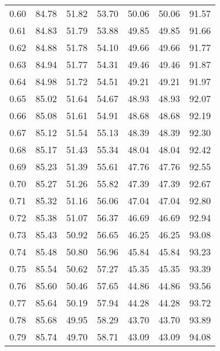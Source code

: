 \begin{tabular}{|c|c|c|c|c|c|c|}
      0.60 &     84.78 &     51.82 &      53.70 &   50.06 &      50.06 &         91.57 \\
      0.61 &     84.83 &     51.79 &      53.88 &   49.85 &      49.85 &         91.66 \\
      0.62 &     84.88 &     51.78 &      54.10 &   49.66 &      49.66 &         91.77 \\
      0.63 &     84.94 &     51.77 &      54.31 &   49.46 &      49.46 &         91.87 \\
      0.64 &     84.98 &     51.72 &      54.51 &   49.21 &      49.21 &         91.97 \\
      0.65 &     85.02 &     51.64 &      54.67 &   48.93 &      48.93 &         92.07 \\
      0.66 &     85.08 &     51.61 &      54.91 &   48.68 &      48.68 &         92.19 \\
      0.67 &     85.12 &     51.54 &      55.13 &   48.39 &      48.39 &         92.30 \\
      0.68 &     85.17 &     51.43 &      55.34 &   48.04 &      48.04 &         92.42 \\
      0.69 &     85.23 &     51.39 &      55.61 &   47.76 &      47.76 &         92.55 \\
      0.70 &     85.27 &     51.26 &      55.82 &   47.39 &      47.39 &         92.67 \\
      0.71 &     85.32 &     51.16 &      56.06 &   47.04 &      47.04 &         92.80 \\
      0.72 &     85.38 &     51.07 &      56.37 &   46.69 &      46.69 &         92.94 \\
      0.73 &     85.43 &     50.92 &      56.65 &   46.25 &      46.25 &         93.08 \\
      0.74 &     85.48 &     50.80 &      56.96 &   45.84 &      45.84 &         93.23 \\
      0.75 &     85.54 &     50.62 &      57.27 &   45.35 &      45.35 &         93.39 \\
      0.76 &     85.60 &     50.46 &      57.65 &   44.86 &      44.86 &         93.56 \\
      0.77 &     85.64 &     50.19 &      57.94 &   44.28 &      44.28 &         93.72 \\
      0.78 &     85.68 &     49.95 &      58.29 &   43.70 &      43.70 &         93.89 \\
      0.79 &     85.74 &     49.70 &      58.71 &   43.09 &      43.09 &         94.08 \\

\end{tabular}
